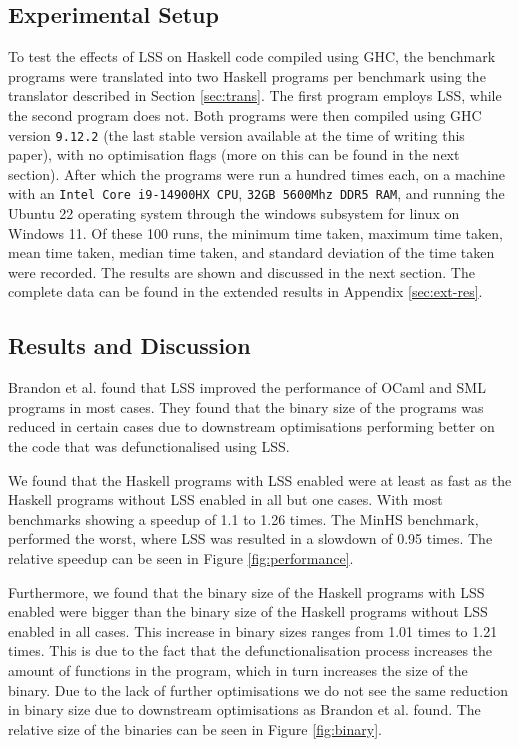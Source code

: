 \documentclass[a4paper,UKenglish,cleveref, autoref, thm-restate]{template/lipics-v2021}
\newcommand{\lss}{LSS\xspace}
\newcommand{\ghc}{GHC\xspace}
\newcommand{\sml}{SML\xspace}
\begin{document}
\subsection{Experimental Setup}
To test the effects of \lss on Haskell code compiled using \ghc, the benchmark programs were translated into two Haskell programs per benchmark using the translator described in Section \ref{sec:trans}. The first program employs \lss, while the second program does not. Both programs were then compiled using \ghc version \verb|9.12.2| (the last stable version available at the time of writing this paper), with no optimisation flags (more on this can be found in the next section). After which the programs were run a hundred times each, on a machine with an \verb|Intel Core i9-14900HX CPU|, \verb|32GB 5600Mhz DDR5 RAM|, and running the Ubuntu 22 operating system through the windows subsystem for linux on Windows 11. Of these 100 runs, the minimum time taken, maximum time taken, mean time taken, median time taken, and standard deviation of the time taken were recorded. The results are shown and discussed in the next section. The complete data can be found in the extended results in Appendix \ref{sec:ext-res}.

\subsection{Results and Discussion}
Brandon et al. \cite{brandon2023better} found that \lss improved the performance of OCaml and \sml programs in most cases. They found that the binary size of the programs was reduced in certain cases due to downstream optimisations performing better on the code that was defunctionalised using \lss.

We found that the Haskell programs with \lss enabled were at least as fast as the Haskell programs without \lss enabled in all but one cases. With most benchmarks showing a speedup of 1.1 to 1.26 times. The MinHS benchmark, performed the worst, where \lss was resulted in a slowdown of 0.95 times. The relative speedup can be seen in Figure \ref{fig:performance}.

Furthermore, we found that the binary size of the Haskell programs with \lss enabled were bigger than the binary size of the Haskell programs without \lss enabled in all cases. This increase in binary sizes ranges from 1.01 times to 1.21 times. This is due to the fact that the defunctionalisation process increases the amount of functions in the program, which in turn increases the size of the binary. Due to the lack of further optimisations we do not see the same reduction in binary size due to downstream optimisations as Brandon et al. \cite{brandon2023better} found. The relative size of the binaries can be seen in Figure \ref{fig:binary}.
\end{document}
